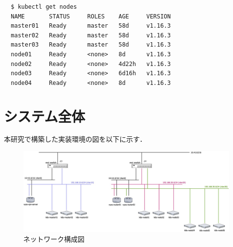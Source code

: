 \begin{lstlisting}
  $ kubectl get nodes
  NAME       STATUS     ROLES    AGE     VERSION
  master01   Ready      master   58d     v1.16.3
  master02   Ready      master   58d     v1.16.3
  master03   Ready      master   58d     v1.16.3
  node01     Ready      <none>   8d      v1.16.3
  node02     Ready      <none>   4d22h   v1.16.3
  node03     Ready      <none>   6d16h   v1.16.3
  node04     Ready      <none>   8d      v1.16.3
\end{lstlisting}

\section{システム全体}
\label{implementation:system}
本研究で構築した実装環境の図を以下に示す．

\begin{landscape}
  \begin{figure}[htbp]
    \begin{center}
      \includegraphics[width=\textwidth]{./figures/network-diagram.jpg}
      \caption{ネットワーク構成図}
    \end{center}
  \end{figure}
\end{landscape}


